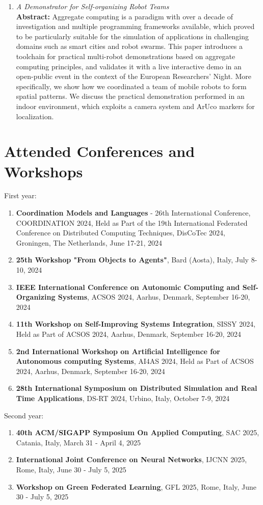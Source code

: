 \documentclass[runningheads]{llncs}
\begin{document}
\begin{enumerate}
    \item \emph{A Demonstrator for Self-organizing Robot Teams}~\cite{DBLP:conf/coordination/AguzziBBCCDFPV25} \\
    \textbf{Abstract: }
    Aggregate computing is a paradigm with over a decade of investigation and multiple programming frameworks available, 
     which proved to be particularly suitable for the simulation of applications in challenging domains such as smart cities
     and robot swarms. 
    This paper introduces a toolchain for practical multi-robot demonstrations based on aggregate computing principles, 
     and validates it with a live interactive demo in an open-public event in the context of the European Researchers' Night. 
    More specifically, we show how we coordinated a team of mobile robots to form spatial patterns.
    We discuss the practical demonstration performed in an indoor environment, 
     which exploits a camera system and ArUco markers for localization.
\end{enumerate}


\section{Attended Conferences and Workshops}
First year:
\begin{enumerate}
    \item \textbf{Coordination Models and Languages} - 26th International Conference, COORDINATION 2024, Held as Part of the 19th International Federated Conference on Distributed Computing Techniques, DisCoTec 2024, Groningen, The Netherlands, June 17-21, 2024
    \item \textbf{25th Workshop "From Objects to Agents"}, Bard (Aosta), Italy, July 8-10, 2024
    \item \textbf{IEEE International Conference on Autonomic Computing and Self-Organizing Systems}, ACSOS 2024, Aarhus, Denmark, September 16-20, 2024
    \item \textbf{11th Workshop on Self-Improving Systems Integration}, SISSY 2024, Held as Part of ACSOS 2024, Aarhus, Denmark, September 16-20, 2024
    \item \textbf{2nd International Workshop on Artificial Intelligence for Autonomous computing Systems}, AI4AS 2024, Held as Part of ACSOS 2024, Aarhus, Denmark, September 16-20, 2024
    \item \textbf{28th International Symposium on Distributed Simulation and Real Time Applications}, DS-RT 2024, Urbino, Italy, October 7-9, 2024
\end{enumerate}
Second year:
\begin{enumerate}
    \item \textbf{40th ACM/SIGAPP Symposium On Applied Computing}, SAC 2025, Catania, Italy, March 31 - April 4, 2025
    \item \textbf{International Joint Conference on Neural Networks}, IJCNN 2025, Rome, Italy,  June 30 - July 5, 2025
    \item \textbf{Workshop on Green Federated Learning}, GFL 2025, Rome, Italy,  June 30 - July 5, 2025
\end{enumerate}
\end{document}

